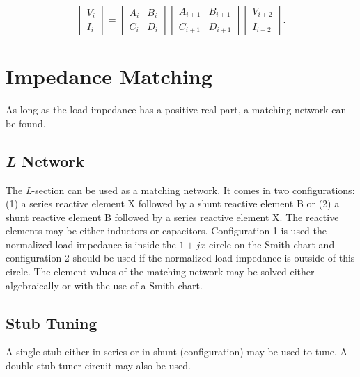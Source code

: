 \documentclass{article}
\begin{document}
\begin{equation}
	\begin{bmatrix}
		V_i\\
		I_i
	\end{bmatrix}=
	\begin{bmatrix}
		A_i&B_i\\
		C_i&D_i
	\end{bmatrix}
	\begin{bmatrix}
		A_{i+1}&B_{i+1}\\
		C_{i+1}&D_{i+1}
	\end{bmatrix}	
	\begin{bmatrix}
		V_{i+2}\\
		I_{i+2}
	\end{bmatrix}.
\end{equation}

	\section{Impedance Matching}
As long as the load impedance has a positive real part, a matching network can be found.
		\subsection{\emph{L} Network}
The \emph{L}-section can be used as a matching network. It comes in two configurations: (1) a series reactive element X followed by a shunt reactive element B or (2) a shunt reactive element B followed by a series reactive element X. The reactive elements may be either inductors or capacitors. Configuration 1 is used the normalized load impedance is inside the $1+jx$ circle on the Smith chart and configuration 2 should be used if the normalized load impedance is outside of this circle. The element values of the matching network may be solved either algebraically or with the use of a Smith chart.
		\subsection{Stub Tuning}
A single stub either in series or in shunt (configuration) may be used to tune. A double-stub tuner circuit may also be used.
\end{document}
